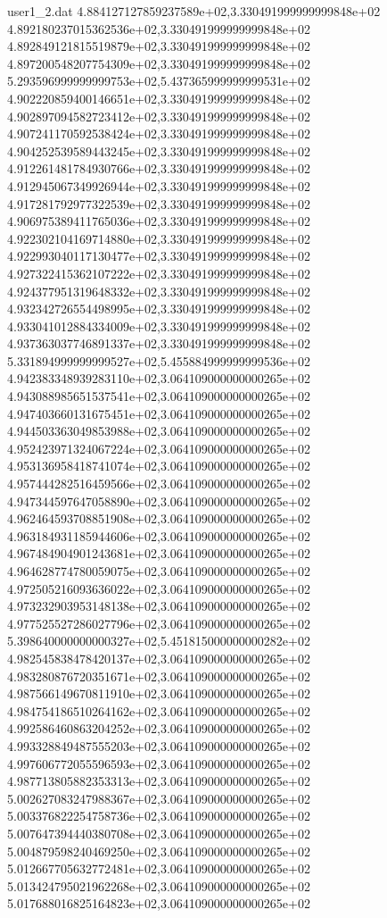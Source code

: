 \begin{filecontents}{user1_2.dat}
4.884127127859237589e+02,3.330491999999999848e+02
4.892180237015362536e+02,3.330491999999999848e+02
4.892849121815519879e+02,3.330491999999999848e+02
4.897200548207754309e+02,3.330491999999999848e+02
5.293596999999999753e+02,5.437365999999999531e+02
4.902220859400146651e+02,3.330491999999999848e+02
4.902897094582723412e+02,3.330491999999999848e+02
4.907241170592538424e+02,3.330491999999999848e+02
4.904252539589443245e+02,3.330491999999999848e+02
4.912261481784930766e+02,3.330491999999999848e+02
4.912945067349926944e+02,3.330491999999999848e+02
4.917281792977322539e+02,3.330491999999999848e+02
4.906975389411765036e+02,3.330491999999999848e+02
4.922302104169714880e+02,3.330491999999999848e+02
4.922993040117130477e+02,3.330491999999999848e+02
4.927322415362107222e+02,3.330491999999999848e+02
4.924377951319648332e+02,3.330491999999999848e+02
4.932342726554498995e+02,3.330491999999999848e+02
4.933041012884334009e+02,3.330491999999999848e+02
4.937363037746891337e+02,3.330491999999999848e+02
5.331894999999999527e+02,5.455884999999999536e+02
4.942383348939283110e+02,3.064109000000000265e+02
4.943088985651537541e+02,3.064109000000000265e+02
4.947403660131675451e+02,3.064109000000000265e+02
4.944503363049853988e+02,3.064109000000000265e+02
4.952423971324067224e+02,3.064109000000000265e+02
4.953136958418741074e+02,3.064109000000000265e+02
4.957444282516459566e+02,3.064109000000000265e+02
4.947344597647058890e+02,3.064109000000000265e+02
4.962464593708851908e+02,3.064109000000000265e+02
4.963184931185944606e+02,3.064109000000000265e+02
4.967484904901243681e+02,3.064109000000000265e+02
4.964628774780059075e+02,3.064109000000000265e+02
4.972505216093636022e+02,3.064109000000000265e+02
4.973232903953148138e+02,3.064109000000000265e+02
4.977525527286027796e+02,3.064109000000000265e+02
5.398640000000000327e+02,5.451815000000000282e+02
4.982545838478420137e+02,3.064109000000000265e+02
4.983280876720351671e+02,3.064109000000000265e+02
4.987566149670811910e+02,3.064109000000000265e+02
4.984754186510264162e+02,3.064109000000000265e+02
4.992586460863204252e+02,3.064109000000000265e+02
4.993328849487555203e+02,3.064109000000000265e+02
4.997606772055596593e+02,3.064109000000000265e+02
4.987713805882353313e+02,3.064109000000000265e+02
5.002627083247988367e+02,3.064109000000000265e+02
5.003376822254758736e+02,3.064109000000000265e+02
5.007647394440380708e+02,3.064109000000000265e+02
5.004879598240469250e+02,3.064109000000000265e+02
5.012667705632772481e+02,3.064109000000000265e+02
5.013424795021962268e+02,3.064109000000000265e+02
5.017688016825164823e+02,3.064109000000000265e+02

\end{filecontents}
